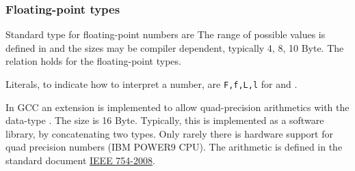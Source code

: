 \subsubsection{Floating-point types}
Standard type for floating-point numbers are
%
%
The range of possible values is defined in  and the sizes may be compiler dependent, typically 4, 8, 10 Byte. The relation
%
%
holds for the floating-point types.

Literals, to indicate how to interpret a number, are \texttt{F,f,L,l} for  and .

\begin{rem}
  In GCC an extension is implemented to allow quad-precision arithmetics with the data-type . The size is 16 Byte. Typically, this
  is implemented as a software library, \eg by concatenating two  types. Only rarely there is hardware support for quad precision
  numbers (\eg IBM POWER9 CPU). The arithmetic is defined in the standard document \href{https://doi.org/10.1109%2FIEEESTD.2008.4610935}{IEEE 754-2008}.
\end{rem}


